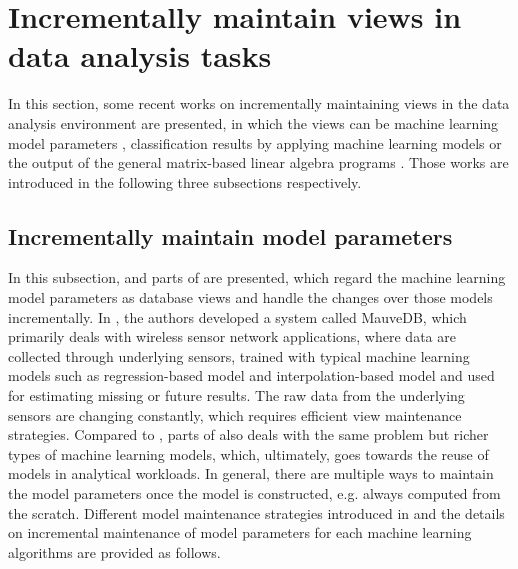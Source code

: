 \section{Incrementally maintain views in data analysis tasks}\label{sec: maintain_views}
In this section, some recent works on incrementally maintaining views in the data analysis environment are presented, in which the views can be machine learning model parameters \cite{deshpande2006mauvedb, gupta2015processing}, classification results by applying machine learning models \cite{koc2011incrementally} or the output of the general matrix-based linear algebra programs \cite{nikolic2014linview}. Those works are introduced in the following three subsections respectively. 


\subsection{Incrementally maintain model parameters}\label{sec: maintain_model_para}
In this subsection, \cite{deshpande2006mauvedb} and parts of \cite{gupta2015processing} are presented, which regard the machine learning model parameters as database views and handle the changes over those models incrementally. In \cite{deshpande2006mauvedb}, the authors developed a system called MauveDB, which primarily deals with wireless sensor network applications, where data are collected through underlying sensors, trained with typical machine learning models such as regression-based model and interpolation-based model and used for estimating missing or future results. 
The raw data from the underlying sensors are changing constantly, which requires efficient view maintenance strategies. 
Compared to \cite{deshpande2006mauvedb}, parts of \cite{gupta2015processing} also deals with the same problem but richer types of machine learning models, which, ultimately, goes towards the reuse of models in analytical workloads. In general, there are multiple ways to maintain the model parameters once the model is constructed, e.g. always computed from the scratch. Different model maintenance strategies introduced in \cite{deshpande2006mauvedb} and the details on incremental maintenance of model parameters for each machine learning algorithms are provided as follows.




